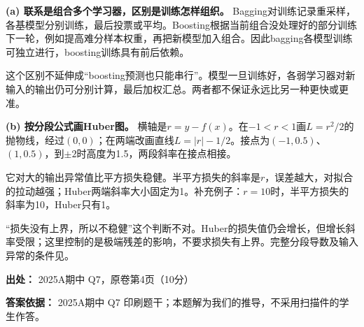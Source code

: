 \textbf{(a) 联系是组合多个学习器，区别是训练怎样组织。} Bagging对训练记录重采样，各基模型分别训练，最后投票或平均。Boosting根据当前组合没处理好的部分训练下一轮，例如提高难分样本权重，再把新模型加入组合。因此bagging各模型训练可独立进行，boosting训练具有前后依赖。


这个区别不延伸成“boosting预测也只能串行”。模型一旦训练好，各弱学习器对新输入的输出仍可分别计算，最后加权汇总。两者都不保证永远比另一种更快或更准。


\textbf{(b) 按分段公式画Huber图。} 横轴是\(r=y-f(x)\)。在\(-1<r<1\)画\(L=r^2/2\)的抛物线，经过\((0,0)\)；在两端改画直线\(L=|r|-1/2\)。接点为\((-1,0.5)\)、\((1,0.5)\)，到\(\pm2\)时高度为1.5，两段斜率在接点相接。




它对大的输出异常值比平方损失稳健。半平方损失的斜率是\(r\)，误差越大，对拟合的拉动越强；Huber两端斜率大小固定为1。补充例子：\(r=10\)时，半平方损失的斜率为10，Huber只有1。


“损失没有上界，所以不稳健”这个判断不对。Huber的损失值仍会增长，但增长斜率受限；这里控制的是极端残差的影响，不要求损失有上界。完整分段导数及输入异常的条件见。


\textbf{出处：} 2025A期中 Q7，原卷第4页（10分）


\textbf{答案依据：} 2025A期中 Q7 印刷题干；本题解为我们的推导，不采用扫描件的学生作答。

